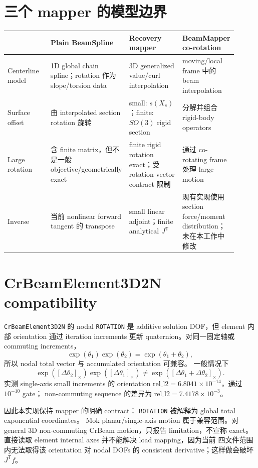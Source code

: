 \documentclass[11pt,a4paper]{article}
\newcommand{\T}{\mathsf{T}}
\newcommand{\relLtwo}{\mathrm{rel\_l2}}
\begin{document}
\section{三个 mapper 的模型边界}

\begin{longtable}{p{0.20\linewidth}p{0.24\linewidth}p{0.25\linewidth}p{0.22\linewidth}}
\toprule
 & Plain BeamSpline & Recovery mapper & BeamMapper co-rotation\\
\midrule
\endhead
Centerline model &
1D global chain spline；rotation 作为 slope/torsion data &
3D generalized value/curl interpolation &
moving/local frame 中的 beam interpolation\\
Surface offset &
由 interpolated section rotation 旋转 &
small: $s(X_s)$；finite: $SO(3)$ rigid section &
分解并组合 rigid-body operators\\
Large rotation &
含 finite matrix，但不是一般 objective/geometrically exact &
finite rigid rotation exact；受 rotation-vector contract 限制 &
通过 co-rotating frame 处理 large motion\\
Inverse &
当前 nonlinear forward tangent 的 transpose &
small linear adjoint；finite analytical $J^\T$ &
现有实现使用 section force/moment distribution；未在本工作中修改\\
\bottomrule
\end{longtable}

\section{CrBeamElement3D2N compatibility}

\texttt{CrBeamElement3D2N} 的 nodal \texttt{ROTATION} 是 additive
solution DOF，但 element 内部 orientation 通过 iteration increments
更新 quaternion。对同一固定轴或 commuting increments，
\[
 \exp(\theta_1)\exp(\theta_2)=\exp(\theta_1+\theta_2),
\]
所以 nodal total vector 与 accumulated orientation 可兼容。
一般情况下
\[
 \exp([\Delta\theta_2]_\times)\exp([\Delta\theta_1]_\times)
 \ne
 \exp([\Delta\theta_1+\Delta\theta_2]_\times).
\]
实测 single-axis small increments 的 orientation
$\relLtwo=6.8041\times10^{-14}$，通过 $10^{-10}$ gate；
non-commuting sequence 的差异为
$\relLtwo=7.4178\times10^{-3}$。

因此本实现保持 mapper 的明确 contract：
\texttt{ROTATION} 被解释为 global total exponential coordinates。
Mok planar/single-axis motion 属于兼容范围。对 general 3D
non-commuting CrBeam motion，只报告 limitation，不宣称 exact。
直接读取 element internal axes 并不能解决 load mapping，因为当前
四文件范围内无法取得该 orientation 对 nodal DOFs 的 consistent
derivative；这样做会破坏 $J^\T f$。
\end{document}
